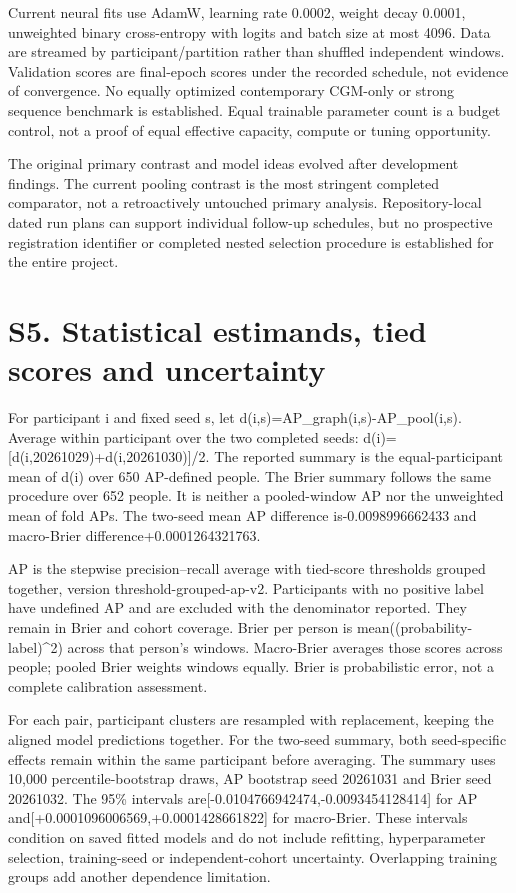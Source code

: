 \documentclass[11pt,a4paper]{article}
\begin{document}
Current neural fits use AdamW, learning rate 0.0002, weight decay 0.0001, unweighted binary cross-entropy with logits and batch size at most 4096. Data are streamed by participant/partition rather than shuffled independent windows. Validation scores are final-epoch scores under the recorded schedule, not evidence of convergence. No equally optimized contemporary CGM-only or strong sequence benchmark is established. Equal trainable parameter count is a budget control, not a proof of equal effective capacity, compute or tuning opportunity.

The original primary contrast and model ideas evolved after development findings. The current pooling contrast is the most stringent completed comparator, not a retroactively untouched primary analysis. Repository-local dated run plans can support individual follow-up schedules, but no prospective registration identifier or completed nested selection procedure is established for the entire project.

\section*{S5. Statistical estimands, tied scores and uncertainty}
For participant i and fixed seed s, let d(i,s)=AP\_\allowbreak{}graph(i,s)-AP\_\allowbreak{}pool(i,s). Average within participant over the two completed seeds: d(i)=[d(i,20261029)+d(i,20261030)]/2. The reported summary is the equal-participant mean of d(i) over 650 AP-defined people. The Brier summary follows the same procedure over 652 people. It is neither a pooled-window AP nor the unweighted mean of fold APs. The two-seed mean AP difference is-0.0098996662433 and macro-Brier difference+0.0001264321763.

AP is the stepwise precision--recall average with tied-score thresholds grouped together, version threshold-grouped-ap-v2. Participants with no positive label have undefined AP and are excluded with the denominator reported. They remain in Brier and cohort coverage. Brier per person is mean((probability-label)\textasciicircum{}2) across that person's windows. Macro-Brier averages those scores across people; pooled Brier weights windows equally. Brier is probabilistic error, not a complete calibration assessment.

For each pair, participant clusters are resampled with replacement, keeping the aligned model predictions together. For the two-seed summary, both seed-specific effects remain within the same participant before averaging. The summary uses 10,000 percentile-bootstrap draws, AP bootstrap seed 20261031 and Brier seed 20261032. The 95\% intervals are[-0.0104766942474,-0.0093454128414] for AP and[+0.0001096006569,+0.0001428661822] for macro-Brier. These intervals condition on saved fitted models and do not include refitting, hyperparameter selection, training-seed or independent-cohort uncertainty. Overlapping training groups add another dependence limitation.
\end{document}

